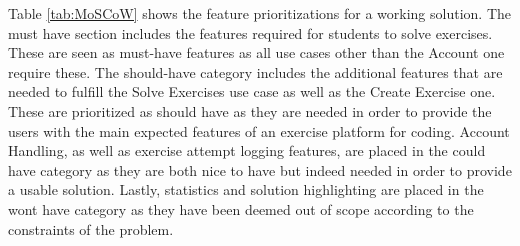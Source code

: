 Table \ref{tab:MoSCoW} shows the feature prioritizations for a working solution.
The must have section includes the features required for students to solve exercises. These are seen as must-have features as all use cases other than the Account one require these.
The should-have category includes the additional features that are needed to fulfill the Solve Exercises use case as well as the Create Exercise one.
These are prioritized as should have as they are needed in order to provide the users with the main expected features of an exercise platform for coding.
Account Handling, as well as exercise attempt logging features, are placed in the could have category as they are both nice to have but indeed needed in order to provide a usable solution.
Lastly, statistics and solution highlighting are placed in the wont have category as they have been deemed out of scope according to the constraints of the problem.


